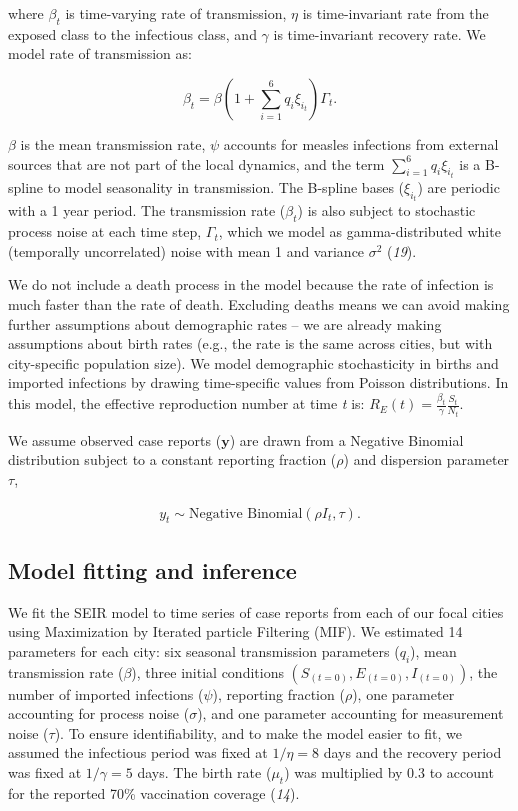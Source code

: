 \documentclass[3p]{elsarticle} %
\begin{document}
\noindent{}where \(\beta_t\) is time-varying rate of transmission,
\(\eta\) is time-invariant rate from the exposed class to the infectious
class, and \(\gamma\) is time-invariant recovery rate. We model rate of
transmission as:

\begin{equation}
\beta_t = \beta \left(1 + \sum^6_{i=1} q_i \xi_{i_{t}} \right) \Gamma_t.
\end{equation}

\(\beta\) is the mean transmission rate, \(\psi\) accounts for measles
infections from external sources that are not part of the local
dynamics, and the term \(\sum^6_{i=1} q_i \xi_{i_{t}}\) is a B-spline to
model seasonality in transmission. The B-spline bases (\(\xi_{i_{t}}\))
are periodic with a 1 year period. The transmission rate (\(\beta_t\))
is also subject to stochastic process noise at each time step,
\(\Gamma_t\), which we model as gamma-distributed white (temporally
uncorrelated) noise with mean 1 and variance \(\sigma^2\) (\emph{19}).

We do not include a death process in the model because the rate of
infection is much faster than the rate of death. Excluding deaths means
we can avoid making further assumptions about demographic rates -- we
are already making assumptions about birth rates (e.g., the rate is the
same across cities, but with city-specific population size). We model
demographic stochasticity in births and imported infections by drawing
time-specific values from Poisson distributions. In this model, the
effective reproduction number at time \emph{t} is:
\(R_E(t) = \frac{\beta_t}{\gamma} \frac{S_t}{N_t}\).

We assume observed case reports (\(\textbf{y}\)) are drawn from a
Negative Binomial distribution subject to a constant reporting fraction
(\(\rho\)) and dispersion parameter \(\tau\),

\begin{align}
y_t \sim \text{Negative Binomial} \left( \rho I_t, \tau \right).
\end{align}

\subsection{Model fitting and
inference}\label{model-fitting-and-inference}

We fit the SEIR model to time series of case reports from each of our
focal cities using Maximization by Iterated particle Filtering (MIF). We
estimated 14 parameters for each city: six seasonal transmission
parameters (\(q_i\)), mean transmission rate (\(\beta\)), three initial
conditions \(\left(S_{(t=0)},E_{(t=0)},I_{(t=0)}\right)\), the number of
imported infections (\(\psi\)), reporting fraction (\(\rho\)), one
parameter accounting for process noise (\(\sigma\)), and one parameter
accounting for measurement noise (\(\tau\)). To ensure identifiability,
and to make the model easier to fit, we assumed the infectious period
was fixed at \(1/\eta = 8\) days and the recovery period was fixed at
\(1/\gamma = 5\) days. The birth rate (\(\mu_t\)) was multiplied by 0.3
to account for the reported 70\% vaccination coverage (\emph{14}).
\end{document}
